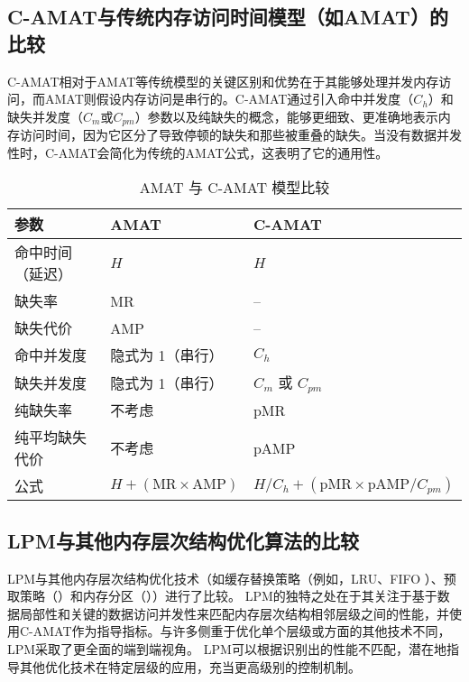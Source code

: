 \documentclass[UTF8]{ctexart}
\begin{document}
\subsection{C-AMAT与传统内存访问时间模型（如AMAT）的比较}
C-AMAT相对于AMAT等传统模型的关键区别和优势在于其能够处理并发内存访问，而AMAT则假设内存访问是串行的\cite{ref1}。C-AMAT通过引入命中并发度（$C_h$）和缺失并发度（$C_m$或$C_{pm}$）参数以及纯缺失的概念，能够更细致、更准确地表示内存访问时间，因为它区分了导致停顿的缺失和那些被重叠的缺失\cite{sunCAMATPage}。当没有数据并发性时，C-AMAT会简化为传统的AMAT公式\cite{sunCAMATPage}，这表明了它的通用性。

\begin{table}[htbp]
    \centering
    \caption{AMAT 与 C-AMAT 模型比较}
    \label{tab:amat_vs_camat}
    \begin{tabular}{@{}lll@{}}
        \toprule
        参数 & AMAT & C-AMAT \\
        \midrule
        命中时间（延迟） & $H$ & $H$ \\
        缺失率 & MR & -- \\ %
        缺失代价 & AMP & -- \\ %
        命中并发度 & 隐式为 1（串行） & $C_h$ \\
        缺失并发度 & 隐式为 1（串行） & $C_m$ 或 $C_{pm}$ \\
        纯缺失率 & 不考虑 & pMR \\
        纯平均缺失代价 & 不考虑 & pAMP \\
        \midrule
        公式 & $H + (\text{MR} \times \text{AMP})$ & $H / C_h + (\text{pMR} \times \text{pAMP} / C_{pm})$ \\
        \bottomrule
    \end{tabular}
\end{table}

\subsection{LPM与其他内存层次结构优化算法的比较}
LPM与其他内存层次结构优化技术（如缓存替换策略（例如，LRU、FIFO \cite{cacheReplacementWiki, cacheReplacementFiveable}）、预取策略（\cite{memHierarchyOptHPC}）和内存分区（\cite{iitGnosisOptmem}））进行了比较。
LPM的独特之处在于其关注于基于数据局部性和关键的数据访问并发性来匹配内存层次结构相邻层级之间的性能，并使用C-AMAT作为指导指标\cite{sun2018optimizing}。与许多侧重于优化单个层级或方面的其他技术不同，LPM采取了更全面的端到端视角。
LPM可以根据识别出的性能不匹配，潜在地指导其他优化技术在特定层级的应用，充当更高级别的控制机制\cite{liu2024lpm}。
\end{document}

